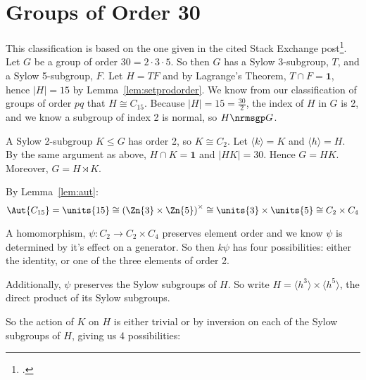 \section{Groups of Order 30}
This classification is based on the one given in the cited Stack Exchange post\footcite{order30}.
Let \(G\) be a group of order \(30 = 2 \cdot 3 \cdot 5\).
So then \(G\) has a Sylow 3-subgroup, \(T\), and a Sylow 5-subgroup, \(F\).
Let \(H = TF\) and by Lagrange's Theorem, \(T \cap F = \bm{1}\), hence \(|H| = 15\) by Lemma~\ref{lem:setprodorder}.
We know from our classification of groups of order \(pq\) that \(H \cong C_{15}\).
Because \(|H| = 15 = \frac{30}{2}\), the index of \(H\) in \(G\) is 2, and we know a subgroup of index 2 is normal, so \(H \nrmsgp G\).

A Sylow 2-subgroup \(K \leqslant G\) has order 2, so \(K \cong C_2\).
Let \(\langle k \rangle = K\) and \(\langle h \rangle = H\).
By the same argument as above, \(H \cap K = \bm{1}\) and \(|HK| = 30\).
Hence \(G = HK\).
Moreover, \(G = H \rtimes K\).

By Lemma~\ref{lem:aut}:
\[\Aut{C_{15}} = \units{15} \cong {(\Zn{3} \times \Zn{5})}^\times \cong \units{3} \times \units{5} \cong C_2 \times C_4\]

A homomorphism, \(\psi:C_2 \to C_2 \times C_4\) preserves element order and we know \(\psi\) is determined by it's effect on a generator.
So then \(k\psi\) has four possibilities: either the identity, or one of the three elements
of order 2.

Additionally, \(\psi\) preserves the Sylow subgroups of \(H\).
So write \(H = \langle h^3 \rangle \times \langle h^5 \rangle\), the direct product of its Sylow subgroups.

So the action of \(K\) on \(H\) is either trivial or by inversion on each of the Sylow subgroups of \(H\), giving us 4
possibilities:


